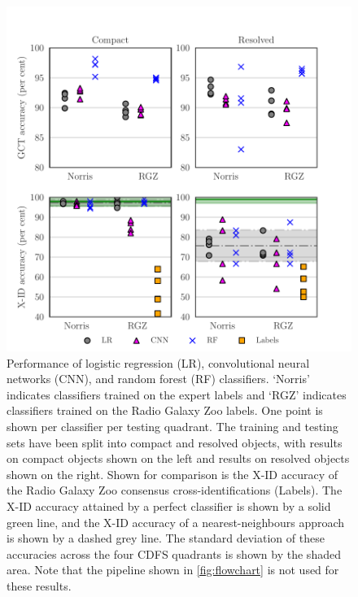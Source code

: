 \documentclass[fleqn,usenatbib,usedcolumn]{mnras}
\begin{document}
    \begin{figure}
    \centering
    \includegraphics[width=\columnwidth]{images/cdfs-grid-new.pdf}
    \caption{Performance of logistic regression (LR), convolutional neural networks (CNN), and random forest (RF) classifiers. `Norris' indicates classifiers trained on the expert labels and `RGZ' indicates classifiers trained on the Radio Galaxy Zoo labels. One point is shown per classifier per testing quadrant. The training and testing sets have been split into compact and resolved objects, with results on compact objects shown on the left and results on resolved objects shown on the right. Shown for comparison is the X-ID accuracy of the Radio Galaxy Zoo consensus cross-identifications (Labels). The X-ID accuracy attained by a perfect classifier is shown by a solid green line, and the X-ID accuracy of a nearest-neighbours approach is shown by a dashed grey line. The standard deviation of these accuracies across the four CDFS quadrants is shown by the shaded area. Note that the pipeline shown in \autoref{fig:flowchart} is not used for these results.
        \label{fig:ba}}
    \end{figure}
\end{document}
